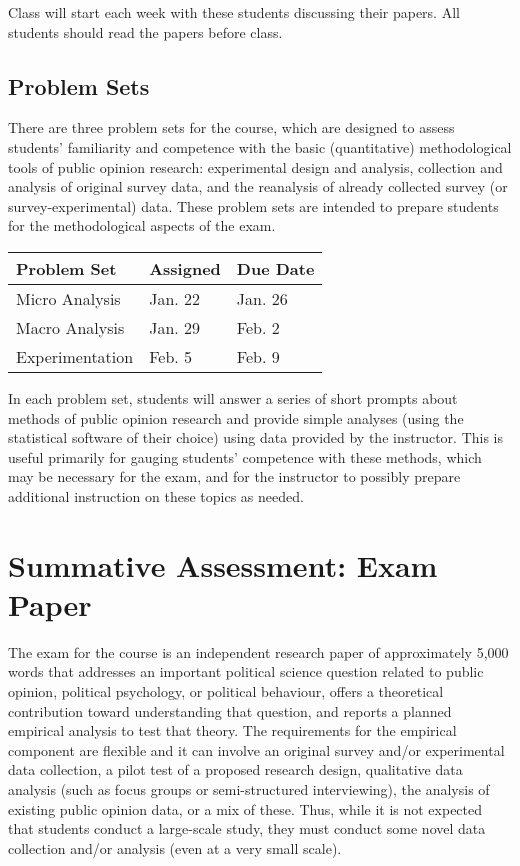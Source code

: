 \documentclass[12pt,a4paper]{article}
\begin{document}
Class will start each week with these students discussing their papers. All students should read the papers before class.

\subsection{Problem Sets}

There are three problem sets for the course, which are designed to assess students' familiarity and competence with the basic (quantitative) methodological tools of public opinion research: experimental design and analysis, collection and analysis of original survey data, and the reanalysis of already collected survey (or survey-experimental) data. These problem sets are intended to prepare students for the methodological aspects of the exam.

\begin{center}
\begin{tabular}{lll} \hline
\textbf{Problem Set} & \textbf{Assigned} & \textbf{Due Date} \\ \hline
Micro Analysis & Jan. 22 & Jan. 26 \\
Macro Analysis & Jan. 29 & Feb. 2 \\
Experimentation & Feb. 5 & Feb. 9 \\ \hline
\end{tabular}
\end{center}

In each problem set, students will answer a series of short prompts about methods of public opinion research and provide simple analyses (using the statistical software of their choice) using data provided by the instructor. This is useful primarily for gauging students' competence with these methods, which may be necessary for the exam, and for the instructor to possibly prepare additional instruction on these topics as needed.


\section{Summative Assessment: Exam Paper}

The exam for the course is an independent research paper of approximately 5,000 words that addresses an important political science question related to public opinion, political psychology, or political behaviour, offers a theoretical contribution toward understanding that question, and reports a planned empirical analysis to test that theory. The requirements for the empirical component are flexible and it can involve an original survey and/or experimental data collection, a pilot test of a proposed research design, qualitative data analysis (such as focus groups or semi-structured interviewing), the analysis of existing public opinion data, or a mix of these. Thus, while it is not expected that students conduct a large-scale study, they must conduct some novel data collection and/or analysis (even at a very small scale).
\end{document}

